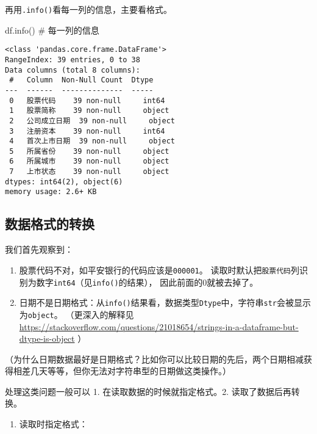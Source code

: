 \documentclass[
  letterpaper,
  DIV=11,
  numbers=noendperiod]{scrreprt}
\newenvironment{Shaded}{\begin{snugshade}}{\end{snugshade}}
\newcommand{\CommentTok}[1]{\textcolor[rgb]{0.37,0.37,0.37}{#1}}
\newcommand{\NormalTok}[1]{\textcolor[rgb]{0.00,0.23,0.31}{#1}}
\providecommand{\tightlist}{%
  \setlength{\itemsep}{0pt}\setlength{\parskip}{0pt}}\usepackage{longtable,booktabs,array}
\begin{document}
再用\texttt{.info()}看每一列的信息，主要看格式。

\begin{Shaded}
\begin{Highlighting}[]
\NormalTok{df.info()  }\CommentTok{\# 每一列的信息}
\end{Highlighting}
\end{Shaded}

\begin{verbatim}
<class 'pandas.core.frame.DataFrame'>
RangeIndex: 39 entries, 0 to 38
Data columns (total 8 columns):
 #   Column  Non-Null Count  Dtype 
---  ------  --------------  ----- 
 0   股票代码    39 non-null     int64 
 1   股票简称    39 non-null     object
 2   公司成立日期  39 non-null     object
 3   注册资本    39 non-null     int64 
 4   首次上市日期  39 non-null     object
 5   所属省份    39 non-null     object
 6   所属城市    39 non-null     object
 7   上市状态    39 non-null     object
dtypes: int64(2), object(6)
memory usage: 2.6+ KB
\end{verbatim}

\hypertarget{ux6570ux636eux683cux5f0fux7684ux8f6cux6362}{%
\subsection{数据格式的转换}\label{ux6570ux636eux683cux5f0fux7684ux8f6cux6362}}

我们首先观察到：

\begin{enumerate}
\def\labelenumi{\arabic{enumi}.}
\tightlist
\item
  股票代码不对，如平安银行的代码应该是\texttt{000001}。
  读取时默认把\texttt{股票代码}列识别为数字\texttt{int64}（见\texttt{info()}的结果），
  因此前面的0就被去掉了。
\item
  日期不是日期格式：从\texttt{info()}结果看，数据类型\texttt{Dtype}中，字符串\texttt{str}会被显示为\texttt{object}。
  （更深入的解释见
  \url{https://stackoverflow.com/questions/21018654/strings-in-a-dataframe-but-dtype-is-object}
  ）
\end{enumerate}

（为什么日期数据最好是日期格式？比如你可以比较日期的先后，两个日期相减获得相差几天等等，但你无法对字符串型的日期做这类操作。）

处理这类问题一般可以 1. 在读取数据的时候就指定格式。2.
读取了数据后再转换。

\begin{enumerate}
\def\labelenumi{\arabic{enumi}.}
\tightlist
\item
  读取时指定格式：
\end{enumerate}
\end{document}
